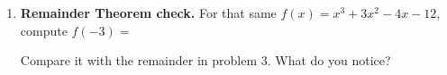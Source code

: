 \documentclass[10pt]{article}
\begin{document}
\begin{tcolorbox}[colback=white, colframe=black!40, title=\textbf{Tier R --- Remediate},
    fonttitle=\bfseries, arc=1.5mm, left=3mm, right=3mm, top=2mm, bottom=2mm, breakable]
\begin{enumerate}[leftmargin=1.7em, itemsep=9pt]
    \vspace{2pt}
    Quotient:  \quad Remainder: 

    \vspace{2pt}
    The quotient is a difference of squares, so factor completely:
    $x^3+3x^2-4x-12 = $ 

  \item \textbf{Remainder Theorem check.} For that same $f(x) = x^3 + 3x^2 - 4x - 12$, compute
    $f(-3) = $ 

    \vspace{2pt}
    Compare it with the remainder in problem 3. What do you notice? 
\end{enumerate}
\end{tcolorbox}
\end{document}

